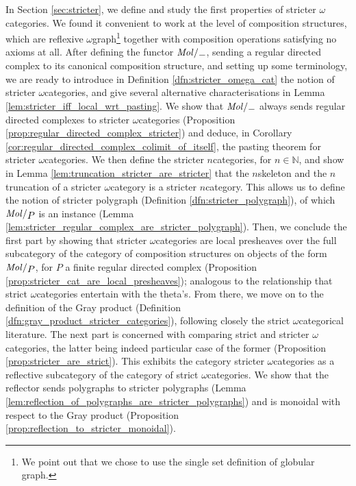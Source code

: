 In Section \ref{sec:stricter}, we define and study the first properties of stricter \( \omega \)\nbd categories.
We found it convenient to work at the level of composition structures, which are reflexive \( \omega \)\nbd graph\footnote{We point out that we chose to use the single set definition of globular graph.} together with composition operations satisfying no axioms at all.
After defining the functor \( \molecin{-} \), sending a regular directed complex to its canonical composition structure, and setting up some terminology, we are ready to introduce in Definition \ref{dfn:stricter_omega_cat} the notion of stricter \( \omega \)\nbd categories, and give several alternative characterisations in Lemma \ref{lem:stricter_iff_local_wrt_pasting}.
We show that \( \molecin{-} \) always sends regular directed complexes to stricter \( \omega \)\nbd categories (Proposition \ref{prop:regular_directed_complex_stricter}) and deduce, in Corollary \ref{cor:regular_directed_complex_colimit_of_itself}, the pasting theorem for stricter \( \omega \)\nbd categories.
We then define the stricter \( n \)\nbd categories, for \( n \in \mathbb{N} \), and show in Lemma \ref{lem:truncation_stricter_are_stricter} that the \( n \)\nbd skeleton and the \( n \)\nbd truncation of a stricter \( \omega \)\nbd category is a stricter \( n \)\nbd category.
This allows us to define the notion of stricter polygraph (Definition \ref{dfn:stricter_polygraph}), of which \( \molecin{P} \) is an instance (Lemma \ref{lem:stricter_regular_complex_are_stricter_polygraph}).
Then, we conclude the first part by showing that stricter \( \omega \)\nbd categories are local presheaves over the full subcategory of the category of composition structures on objects of the form \( \molecin{P} \), for \( P \) a finite regular directed complex (Proposition \ref{prop:stricter_cat_are_local_presheaves}); analogous to the relationship that strict \( \omega \)\nbd categories entertain with the theta's.
From there, we move on to the definition of the Gray product (Definition \ref{dfn:gray_product_stricter_categories}), following closely the strict \( \omega \)\nbd categorical literature.
The next part is concerned with comparing strict and stricter \( \omega \)\nbd categories, the latter being indeed particular case of the former (Proposition \ref{prop:stricter_are_strict}).
This exhibits the category stricter \( \omega \)\nbd categories as a reflective subcategory of the category of strict \( \omega \)\nbd categories.
We show that the reflector sends polygraphs to stricter polygraphs (Lemma \ref{lem:reflection_of_polygraphs_are_stricter_polygraphs}) and is monoidal with respect to the Gray product (Proposition \ref{prop:reflection_to_stricter_monoidal}).
